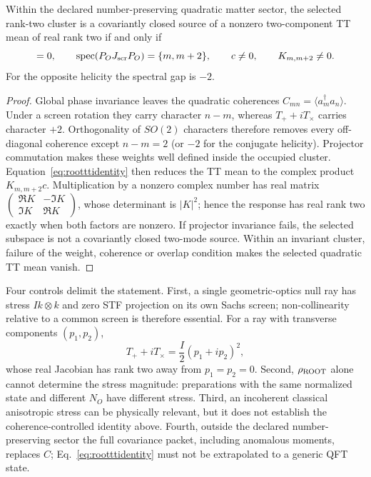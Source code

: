 \begin{proposition}
\label{prop:rootttcertificate}
Within the declared number-preserving quadratic matter sector, the selected
rank-two cluster is a covariantly closed source of a nonzero two-component TT
mean of real rank two if and only if
\begin{equation}
 [P_O,J_{\rm scr}]=0,\qquad
 \operatorname{spec}(P_OJ_{\rm scr}P_O)=\{m,m+2\},\qquad
 c\neq0,\qquad K_{m,m+2}\neq0.
\label{eq:rootttcertificate}
\end{equation}
For the opposite helicity the spectral gap is $-2$.
\end{proposition}

\begin{proof}
Global phase invariance leaves the quadratic coherences
$C_{mn}=\langle a_m^\dagger a_n\rangle$.  Under a screen rotation they carry
character $n-m$, whereas $T_++iT_\times$ carries character $+2$.
Orthogonality of $SO(2)$ characters therefore removes every off-diagonal
coherence except $n-m=2$ (or $-2$ for the conjugate helicity).  Projector
commutation makes these weights well defined inside the occupied cluster.
Equation~\eqref{eq:rootttidentity} then reduces the TT mean to the complex
product $K_{m,m+2}c$.  Multiplication by a nonzero complex number has real
matrix
$\left(\begin{smallmatrix}\Re K&-\Im K\\\Im K&\Re K\end{smallmatrix}\right)$,
whose determinant is $|K|^2$; hence the response has real rank two exactly
when both factors are nonzero.  If projector invariance fails, the selected
subspace is not a covariantly closed two-mode source.  Within an invariant
cluster, failure of the weight, coherence or overlap condition makes the
selected quadratic TT mean vanish.
\end{proof}

Four controls delimit the statement.  First, a single geometric-optics null
ray has stress $I k\otimes k$ and zero STF projection on its own Sachs screen;
non-collinearity relative to a common screen is therefore essential.  For a
ray with transverse components $(p_1,p_2)$,
\begin{equation}
T_+ + iT_\times=\frac{I}{2}(p_1+ip_2)^2,
\end{equation}
whose real Jacobian has rank two away from $p_1=p_2=0$.  Second,
$\rho_{\rm ROOT}$ alone cannot determine the stress magnitude: preparations
with the same normalized state and different $N_O$ have different stress.
Third, an incoherent classical anisotropic stress can be physically relevant,
but it does not establish the coherence-controlled identity above.
Fourth, outside the declared number-preserving sector the full covariance
packet, including anomalous moments, replaces $C$;
Eq.~\eqref{eq:rootttidentity} must not be extrapolated to a generic QFT state.

